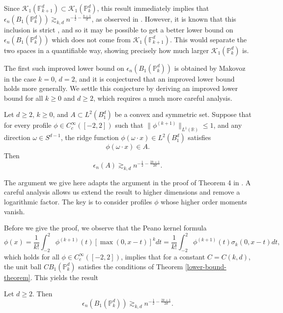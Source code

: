 Since $\mathcal{K}_1(\mathbb{F}_{k+1}^d)\subset \mathcal{K}_1(\mathbb{P}_k^d)$, this result immediately implies that $\epsilon_n(B_1(\mathbb{P}_k^d)) \gtrsim_{k,d} n^{-\frac{1}{2}-\frac{k+1}{d}}$, as observed in \cite{makovoz1996random,klusowski2018approximation}. However, it is known that this inclusion is strict \cite{wojtowytsch2020representation}, and so it may be possible to get a better lower bound on $\epsilon_n(B_1(\mathbb{P}_k^d))$ which does not come from $\mathcal{K}_1(\mathbb{F}_{k+1}^d)$. This would separate the two spaces in a quantifiable way, showing precisely how much larger $\mathcal{K}_1(\mathbb{P}_k^d)$ is. 

The first such improved lower bound on $\epsilon_n(B_1(\mathbb{P}_k^d))$ is obtained by Makovoz \cite{makovoz1996random} in the case $k=0$, $d=2$, and it is conjectured that an improved lower bound holds more generally. We settle this conjecture by deriving an improved lower bound for all $k \geq 0$ and $d\geq 2$, which requires a much more careful analysis.

\begin{theorem}\label{lower-bound-theorem}
 Let $d \geq 2$, $k\geq 0$, and $A\subset L^2(B_1^d)$ be a convex and symmetric set. Suppose that for every profile $\phi\in C_c^\infty([-2,2])$ such that $\|\phi^{(k+1)}\|_{L^1(\mathbb{R})}\leq 1$, and any direction $\omega\in S^{d-1}$, the ridge function $\phi(\omega\cdot x)\in L^2(B_1^d)$ satisfies
 \begin{equation}
  \phi(\omega\cdot x)\in A.
 \end{equation}
 Then
 \begin{equation}
  \epsilon_n(A) \gtrsim_{k,d} n^{-\frac{1}{2}-\frac{2k+1}{2d}}.
 \end{equation}

\end{theorem}
The argument we give here adapts the argument in the proof of Theorem 4 in \cite{makovoz1996random}. A careful analysis allows us extend the result to higher dimensions and remove a logarithmic factor. The key is to consider profiles $\phi$ whose higher order moments vanish. 

Before we give the proof, we observe that the Peano kernel formula
\begin{equation}
 \phi(x) = \frac{1}{k!}\int_{-2}^2 \phi^{(k+1)}(t)[\max(0,x-t)]^kdt = \frac{1}{k!}\int_{-2}^2 \phi^{(k+1)}(t)\sigma_k(0,x-t)dt,
\end{equation}
which holds for all $\phi\in C_c^\infty([-2,2])$, implies that for a constant $C = C(k,d)$, the unit ball $CB_1(\mathbb{P}^d_k)$ satisfies the conditions of Theorem \ref{lower-bound-theorem}. This yields the result
\begin{theorem}\label{relu-k-lower-bound-corollary}
 Let $d \geq 2$. Then
 \begin{equation}
  \epsilon_n(B_1(\mathbb{P}^d_k)) \gtrsim_{k,d} n^{-\frac{1}{2}-\frac{2k+1}{2d}}.
 \end{equation}

\end{theorem}

